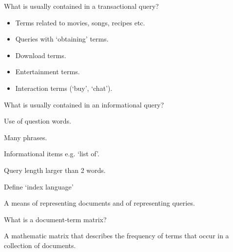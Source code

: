 \documentclass[2by4,grid]{flashcards}
\begin{document}
\begin{flashcard}{What is usually contained in a transactional query?}
	\begin{center}
        \begin{itemize}
            \item Terms related to movies, songs, recipes etc.
            \item Queries with `obtaining' terms.
            \item Download terms.
            \item Entertainment terms.
            \item Interaction terms (`buy', `chat').
        \end{itemize}
	\end{center}
\end{flashcard}

\begin{flashcard}{What is usually contained in an informational query?}
	\begin{center}
        \item Use of question words.
        \item Many phrases.
        \item Informational items e.g. `list of'.
        \item Query length larger than 2 words.
	\end{center}
\end{flashcard}

\begin{flashcard}{Define `index language'}
	\begin{center}
        A means of representing documents and of representing queries.
	\end{center}
\end{flashcard}

\begin{flashcard}{What is a document-term matrix?}
	\begin{center}
        A mathematic matrix that describes the frequency of terms that occur in a collection of documents.
	\end{center}
\end{flashcard}
\end{document}
